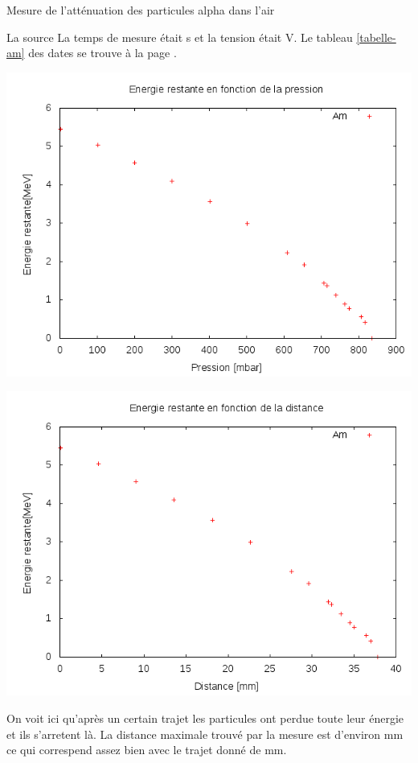 \documentclass[a4paper,11pt,liststotocnumbered,bibtotocnumbered]{scrartcl}
\begin{document}
\begin{section}{Mesure de l'atténuation des particules alpha dans l'air}
 \begin{subsection}{La source }
   La temps de mesure était \unit[20]{s} et la tension était \unit[80]{V}. Le tableau \ref{tabelle-am} des dates se trouve à la page \pageref{tabelle-am}.\\
    \begin{minipage}{0.45\textwidth}
     \includegraphics[width=\textwidth]{Sabine/am_pression.png}
    \end{minipage}
    \hfill
    \begin{minipage}{0.45\textwidth}
     \includegraphics[width=\textwidth]{Sabine/am_distance.png}
    \end{minipage}
   On voit ici qu'après un certain trajet les particules ont perdue toute leur énergie et ils s'arretent là. La distance maximale trouvé par la mesure est d'environ \unit[38]{mm} ce qui correspend assez bien avec le trajet donné de \unit[38,06]{mm}. 
   \end{subsection}


\end{section}
\end{document}
